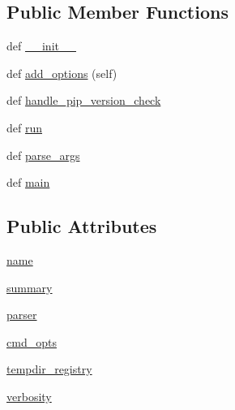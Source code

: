 \subsection*{Public Member Functions}
\begin{DoxyCompactItemize}
\item 
def \hyperlink{classpip_1_1__internal_1_1cli_1_1base__command_1_1Command_a837531e661a4576d634fa8ec7e9bdbb4}{\+\_\+\+\_\+init\+\_\+\+\_\+}
\item 
def \hyperlink{classpip_1_1__internal_1_1cli_1_1base__command_1_1Command_ad6875d77f7af7f3407f97e27c5631353}{add\+\_\+options} (self)
\item 
def \hyperlink{classpip_1_1__internal_1_1cli_1_1base__command_1_1Command_adb707008c7b4f507dea839ab0a6d1870}{handle\+\_\+pip\+\_\+version\+\_\+check}
\item 
def \hyperlink{classpip_1_1__internal_1_1cli_1_1base__command_1_1Command_a0f9bc72e7b82c64312d658e4bbace434}{run}
\item 
def \hyperlink{classpip_1_1__internal_1_1cli_1_1base__command_1_1Command_a9a089ff9c59afd6da0e87621d4c6ae30}{parse\+\_\+args}
\item 
def \hyperlink{classpip_1_1__internal_1_1cli_1_1base__command_1_1Command_ada9502bc2ac117183351ad6bdf1b97b7}{main}
\end{DoxyCompactItemize}
\subsection*{Public Attributes}
\begin{DoxyCompactItemize}
\item 
\hyperlink{classpip_1_1__internal_1_1cli_1_1base__command_1_1Command_a0da6dc821b6ea82a287734d22bf13b36}{name}
\item 
\hyperlink{classpip_1_1__internal_1_1cli_1_1base__command_1_1Command_a48a6dcdddf38765713fec5d08731bef3}{summary}
\item 
\hyperlink{classpip_1_1__internal_1_1cli_1_1base__command_1_1Command_af55279eb904d389000b26fec0cdfb165}{parser}
\item 
\hyperlink{classpip_1_1__internal_1_1cli_1_1base__command_1_1Command_ac92a9689689c17dc866ddeeb2a276ef1}{cmd\+\_\+opts}
\item 
\hyperlink{classpip_1_1__internal_1_1cli_1_1base__command_1_1Command_a5dc04e349a7387dd3faac77580f3ddc0}{tempdir\+\_\+registry}
\item 
\hyperlink{classpip_1_1__internal_1_1cli_1_1base__command_1_1Command_a958ba174a0d03ffa3cfdd3cb2b6d3b9e}{verbosity}
\end{DoxyCompactItemize}

